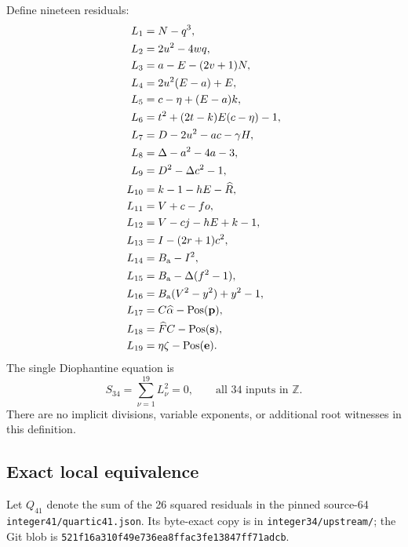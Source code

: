\documentclass[11pt,a4paper]{article}
\theoremstyle{definition}
\newcommand{\Z}{\mathbb Z}
\newcommand{\Pos}{\operatorname{Pos}}
\newcommand{\Baux}{B_{\mathrm a}}
\newcommand{\src}[1]{{\urlstyle{tt}\nolinkurl{#1}}}
\begin{document}
Define nineteen residuals:
\begin{align}
 L_1&=N-q^3, \notag\\
 L_2&=2u^2-4wq, \notag\\
 L_3&=a-E-(2v+1)N, \notag\\
 L_4&=2u^2(E-a)+E, \notag\\
 L_5&=c-\eta+(E-a)k, \notag\\
 L_6&=t^2+(2t-k)E(c-\eta)-1, \notag\\
 L_7&=D-2u^2-ac-\gamma H, \notag\\
 L_8&=\Delta-a^2-4a-3, \notag\\
 L_9&=D^2-\Delta c^2-1, \notag\\
 L_{10}&=k-1-hE-\widehat R, \notag\\
 L_{11}&=V+c-fo, \notag\\
 L_{12}&=V-cj-hE+k-1, \notag\\
 L_{13}&=I-(2r+1)c^2, \notag\\
 L_{14}&=\Baux-I^2, \notag\\
 L_{15}&=\Baux-\Delta(f^2-1), \notag\\
 L_{16}&=\Baux(V^2-y^2)+y^2-1, \notag\\
 L_{17}&=C\widehat\alpha-\Pos(\mathbf p), \notag\\
 L_{18}&=\widehat FC-\Pos(\mathbf s), \notag\\
 L_{19}&=\eta\zeta-\Pos(\mathbf e).              \label{eq:19rows}
\end{align}
The single Diophantine equation is
\[
 \boxed{\displaystyle S_{34}=\sum_{\nu=1}^{19}L_\nu^2=0,
           \qquad\text{all 34 inputs in }\Z.}   \tag{S34}
\]
There are no implicit divisions, variable exponents, or additional
root witnesses in this definition.

\subsection{Exact local equivalence}

Let \(Q_{41}\) denote the sum of the 26 squared residuals in the
pinned source-64 \src{integer41/quartic41.json}. Its byte-exact
copy is in \src{integer34/upstream/}; the Git blob is
\src{521f16a310f49e736ea8ffac3fe13847ff71adcb}.
\end{document}
